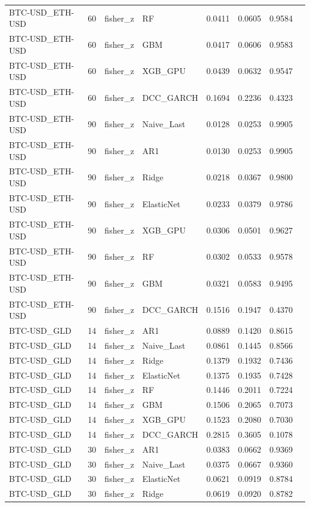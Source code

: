 \begin{table}[H]
\begin{tabular}{llllrrrr}
BTC-USD_ETH-USD & 60 & fisher_z & RF & 0.0411 & 0.0605 & 0.9584 &  \\
BTC-USD_ETH-USD & 60 & fisher_z & GBM & 0.0417 & 0.0606 & 0.9583 &  \\
BTC-USD_ETH-USD & 60 & fisher_z & XGB_GPU & 0.0439 & 0.0632 & 0.9547 &  \\
BTC-USD_ETH-USD & 60 & fisher_z & DCC_GARCH & 0.1694 & 0.2236 & 0.4323 &  \\
BTC-USD_ETH-USD & 90 & fisher_z & Naive_Last & 0.0128 & 0.0253 & 0.9905 &  \\
BTC-USD_ETH-USD & 90 & fisher_z & AR1 & 0.0130 & 0.0253 & 0.9905 &  \\
BTC-USD_ETH-USD & 90 & fisher_z & Ridge & 0.0218 & 0.0367 & 0.9800 &  \\
BTC-USD_ETH-USD & 90 & fisher_z & ElasticNet & 0.0233 & 0.0379 & 0.9786 &  \\
BTC-USD_ETH-USD & 90 & fisher_z & XGB_GPU & 0.0306 & 0.0501 & 0.9627 &  \\
BTC-USD_ETH-USD & 90 & fisher_z & RF & 0.0302 & 0.0533 & 0.9578 &  \\
BTC-USD_ETH-USD & 90 & fisher_z & GBM & 0.0321 & 0.0583 & 0.9495 &  \\
BTC-USD_ETH-USD & 90 & fisher_z & DCC_GARCH & 0.1516 & 0.1947 & 0.4370 &  \\
BTC-USD_GLD & 14 & fisher_z & AR1 & 0.0889 & 0.1420 & 0.8615 &  \\
BTC-USD_GLD & 14 & fisher_z & Naive_Last & 0.0861 & 0.1445 & 0.8566 &  \\
BTC-USD_GLD & 14 & fisher_z & Ridge & 0.1379 & 0.1932 & 0.7436 &  \\
BTC-USD_GLD & 14 & fisher_z & ElasticNet & 0.1375 & 0.1935 & 0.7428 &  \\
BTC-USD_GLD & 14 & fisher_z & RF & 0.1446 & 0.2011 & 0.7224 &  \\
BTC-USD_GLD & 14 & fisher_z & GBM & 0.1506 & 0.2065 & 0.7073 &  \\
BTC-USD_GLD & 14 & fisher_z & XGB_GPU & 0.1523 & 0.2080 & 0.7030 &  \\
BTC-USD_GLD & 14 & fisher_z & DCC_GARCH & 0.2815 & 0.3605 & 0.1078 &  \\
BTC-USD_GLD & 30 & fisher_z & AR1 & 0.0383 & 0.0662 & 0.9369 &  \\
BTC-USD_GLD & 30 & fisher_z & Naive_Last & 0.0375 & 0.0667 & 0.9360 &  \\
BTC-USD_GLD & 30 & fisher_z & ElasticNet & 0.0621 & 0.0919 & 0.8784 &  \\
BTC-USD_GLD & 30 & fisher_z & Ridge & 0.0619 & 0.0920 & 0.8782 &  \\

\end{tabular}
\end{table}
